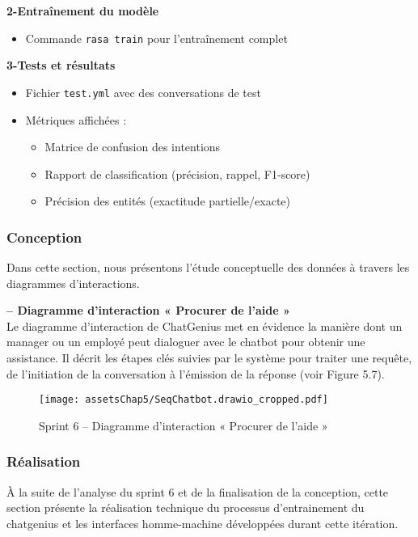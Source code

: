 \textbf{2-Entraînement du modèle}
\begin{itemize}
    \item Commande \texttt{rasa train} pour l'entraînement complet
\end{itemize}

\textbf{3-Tests et résultats}
\begin{itemize}
    \item Fichier \texttt{test.yml} avec des conversations de test
    \item Métriques affichées :
    \begin{itemize}
        \item Matrice de confusion des intentions
        \item Rapport de classification (précision, rappel, F1-score)
        \item Précision des entités (exactitude partielle/exacte)
    \end{itemize}
\end{itemize}



\subsubsection{Conception}
Dans cette section, nous présentons l’étude conceptuelle des données à travers les diagrammes d’interactions.


\textbf{– Diagramme d’interaction « Procurer de l’aide »}\\

Le diagramme d’interaction de ChatGenius met en évidence la manière dont un manager ou un employé peut dialoguer avec le chatbot pour obtenir une assistance. Il décrit les étapes clés suivies par le système pour traiter une requête, de l’initiation de la conversation à l’émission de la réponse (voir Figure 5.7).

\begin{figure}[H]
\centering
\texttt{[image: assetsChap5/SeqChatbot.drawio\_cropped.pdf]}
\caption{Sprint 6 – Diagramme d’interaction « Procurer de l’aide »}
\end{figure}



\subsubsection{Réalisation}
À la suite de l’analyse du sprint 6 et de la finalisation de la conception, cette section présente la réalisation technique du processus d'entrainement du chatgenius et les interfaces homme-machine développées durant cette itération.\\







